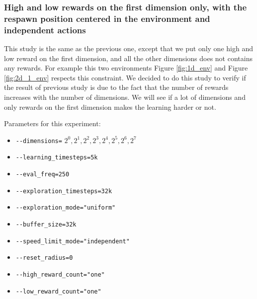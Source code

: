 \documentclass{article}
\begin{document}
\subsubsection{High and low rewards on the first dimension only, with the respawn position centered in the environment and independent actions}

This study is the same as the previous one, except that we put only one high and low reward on the first dimension, and all the other dimensions does not contains any rewards. For example this two environments Figure \ref{fig:1d_env} and Figure \ref{fig:2d_1_env} respects this constraint. We decided to do this study to verify if the result of previous study is due to the fact that the number of rewards increases with the number of dimensions. We will see if a lot of dimensions and only rewards on the first dimension makes the learning harder or not.

Parameters for this experiment:
\begin{itemize}
    \item[] \lstinline|--dimensions=| $2^0, 2^1, 2^2, 2^3, 2^4, 2^5, 2^6, 2^7$
    \item[] \lstinline|--learning_timesteps=5k|
    \item[] \lstinline|--eval_freq=250|
    \item[] \lstinline|--exploration_timesteps=32k|
    \item[] \lstinline|--exploration_mode="uniform"|
    \item[] \lstinline|--buffer_size=32k|
    \item[] \lstinline|--speed_limit_mode="independent"|
    \item[] \lstinline|--reset_radius=0|
    \item[] \lstinline|--high_reward_count="one"|
    \item[] \lstinline|--low_reward_count="one"|
\end{itemize}
\end{document}
